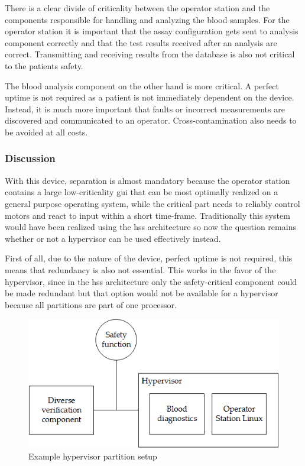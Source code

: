 There is a clear divide of criticality between the operator station and the components responsible for handling and analyzing the blood samples. For the operator station it is important that the assay configuration gets sent to analysis component correctly and that the test results received after an analysis are correct. Transmitting and receiving results from the database is also not critical to the patients safety.

The blood analysis component on the other hand is more critical. A perfect uptime is not required as a patient is not immediately dependent on the device. Instead, it is much more important that faults or incorrect measurements are discovered and communicated to an operator. Cross-contamination also needs to be avoided at all costs.

\subsubsection{Discussion}
With this device, separation is almost mandatory because the operator station contains a large low-criticality \acrshort{gui} that can be most optimally realized on a general purpose operating system, while the critical part needs to reliably control motors and react to input within a short time-frame. Traditionally this system would have been realized using the \acrshort{hss} architecture so now the question remains whether or not a hypervisor can be used effectively instead.

First of all, due to the nature of the device, perfect uptime is not required, this means that redundancy is also not essential. This works in the favor of the hypervisor, since in the \acrshort{hss} architecture only the safety-critical component could be made redundant but that option would not be available for a hypervisor because all partitions are part of one processor. 

\begin{figure}
\centering
\includegraphics[scale=0.75]{Figures/blood_diagnostics_arch}
\decoRule
\caption{Example hypervisor partition setup}
\label{fig:blood_diagnostics_hv_arch}
\end{figure}

